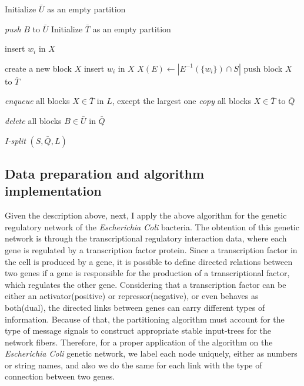 \documentclass[12pt]{diazessay} %
\begin{document}
\begin{algorithm}[t]
	\SetAlgoLined
	Initialize $\bar{U}$ as an empty partition\;
	{
		{
			\textit{push} $B$ to $\bar{U}$\;
			Initialize $\bar{T}$ as an empty partition\;
			{
				{
					insert $w_i$ in $X$\;
					
				}
				{
					create a new block $X$\;
					insert $w_i$ in $X$\;
					$X(E) \leftarrow | E^{-1}(\{w_i\})\cap S |$\;
					push block $X$ to $\bar{T}$ 
				}
			}
		}
		\textit{enqueue} all blocks $X \in \bar{T}$ in $L$, except the largest one\;
		\textit{copy} all blocks $X \in \bar{T}$ to $\bar{Q}$\;
	}
	\textit{delete} all blocks $B \in \bar{U}$ in $\bar{Q}$
	\caption{\textit{I-split} $(S,\bar{Q}, L)$}
	\label{alg:split}
\end{algorithm}

\subsection{Data preparation and algorithm implementation}

Given the description above, next, I apply the above algorithm for the genetic regulatory network of the \textit{Escherichia Coli} bacteria. The obtention of this genetic network is through the transcriptional regulatory interaction data, where each gene is regulated by a transcription factor protein. Since a transcription factor in the cell is produced by a gene, it is possible to define directed relations between two genes if a gene is responsible for the production of a transcriptional factor, which regulates the other gene. Considering that a transcription factor can be either an activator(positive) or repressor(negative), or even behaves as both(dual), the directed links between genes can carry different types of information. Because of that, the partitioning algorithm must account for the type of message signals to construct appropriate stable input-trees for the network fibers. Therefore, for a proper application of the algorithm on the \textit{Escherichia Coli} genetic network, we label each node uniquely, either as numbers or string names, and also we do the same for each link with the type of connection between two genes.
\end{document}
